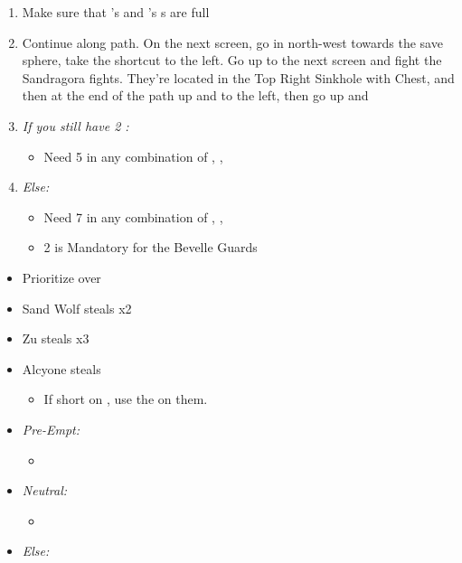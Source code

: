 \begin{enumerate}[resume]
	\item Make sure that \rikku's and \auron's \od s are full
	\item Continue along path. On the next screen, go in north-west towards the save sphere, take the shortcut to the left. Go up to the next screen and fight the Sandragora fights. They're located in the Top Right Sinkhole with Chest, and then at the end of the path up and to the left, then go up and \sd
	\item \textit{If you still have 2 \bombcore{}:}
	      \begin{itemize}
		      \item Need 5 in any combination of \sleepingpowder, \smokebomb, \silencegrenade
	      \end{itemize}
	\item \textit{Else:}
	      \begin{itemize}
		      \item Need 7 in any combination of \sleepingpowder, \smokebomb, \silencegrenade
		      \item 2 \sleepingpowder is Mandatory for the Bevelle Guards
	      \end{itemize}
\end{enumerate}
\winvfill
\begin{encounters}
	\begin{itemize}
		\item Prioritize \sleepingpowder over \smokebomb
		\item Sand Wolf steals \sleepingpowder x2
		\item Zu steals \smokebomb x3
		\item Alcyone steals \smokebomb
		      \begin{itemize}
			      \item If short on \speedsphere, use the \smokebomb on them.
		      \end{itemize}
		\item \textit{Pre-Empt:}
		      \begin{itemize}
			      \tidusf Defend
			      \rikkuf \steal
			      \auronf Defend
			      \item \flee
		      \end{itemize}
		\item \textit{Neutral:}
		      \begin{itemize}
			      \switch{\tidus}{\kimahri}
			      \kimahrif Steal
			      \switch{\rikku}{\tidus}
			      \item \flee
		      \end{itemize}
		\item \textit{Else:} \flee
	\end{itemize}
\end{encounters}
